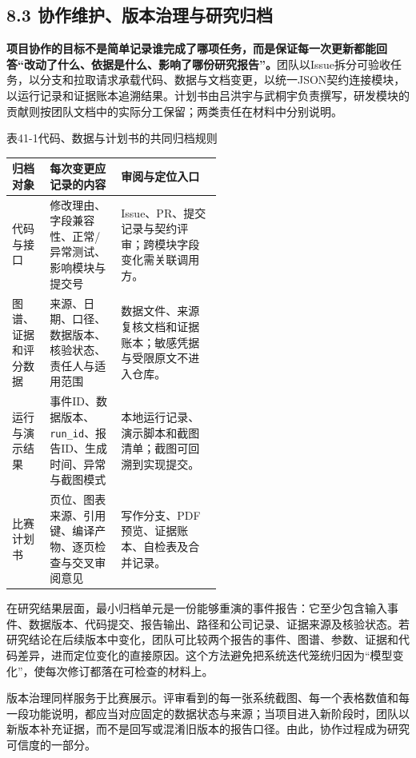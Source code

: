 \subsection*{8.3 协作维护、版本治理与研究归档}\label{page:41}
\noindent\textbf{项目协作的目标不是简单记录谁完成了哪项任务，而是保证每一次更新都能回答“改动了什么、依据是什么、影响了哪份研究报告”。}团队以Issue拆分可验收任务，以分支和拉取请求承载代码、数据与文档变更，以统一JSON契约连接模块，以运行记录和证据账本追溯结果。计划书由吕洪宇与武桐宇负责撰写，研发模块的贡献则按团队文档中的实际分工保留；两类责任在材料中分别说明\cite{lhy-team,lhy-data-standard}。

\begin{center}\small 表41-1\quad 代码、数据与计划书的共同归档规则\par\vspace{1mm}
\begin{tabularx}{\linewidth}{p{0.18\linewidth}p{0.34\linewidth}X}
\toprule
归档对象 & 每次变更应记录的内容 & 审阅与定位入口\\
\midrule
代码与接口 & 修改理由、字段兼容性、正常/异常测试、影响模块与提交号 & Issue、PR、提交记录与契约评审；跨模块字段变化需关联调用方。\\
图谱、证据和评分数据 & 来源、日期、口径、数据版本、核验状态、责任人与适用范围 & 数据文件、来源复核文档和证据账本；敏感凭据与受限原文不进入仓库。\\
运行与演示结果 & 事件ID、数据版本、\texttt{run\_id}、报告ID、生成时间、异常与截图模式 & 本地运行记录、演示脚本和截图清单；截图可回溯到实现提交。\\
比赛计划书 & 页位、图表来源、引用键、编译产物、逐页检查与交叉审阅意见 & 写作分支、PDF预览、证据账本、自检表及合并记录。\\
\bottomrule
\end{tabularx}\end{center}

在研究结果层面，最小归档单元是一份能够重演的事件报告：它至少包含输入事件、数据版本、代码提交、报告输出、路径和公司记录、证据来源及核验状态。若研究结论在后续版本中变化，团队可比较两个报告的事件、图谱、参数、证据和代码差异，进而定位变化的直接原因。这个方法避免把系统迭代笼统归因为“模型变化”，使每次修订都落在可检查的材料上。

版本治理同样服务于比赛展示。评审看到的每一张系统截图、每一个表格数值和每一段功能说明，都应当对应固定的数据状态与来源；当项目进入新阶段时，团队以新版本补充证据，而不是回写或混淆旧版本的报告口径。由此，协作过程成为研究可信度的一部分。
